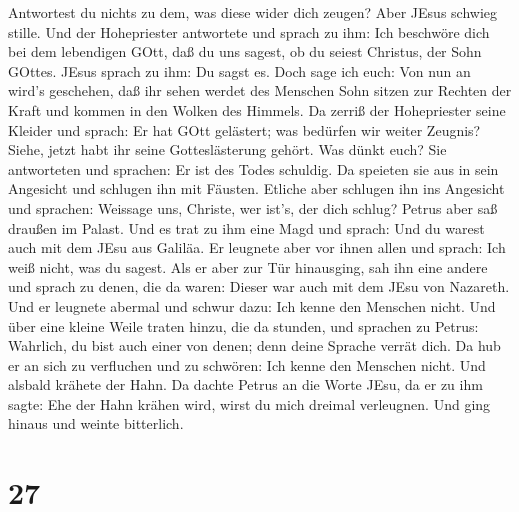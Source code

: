 Antwortest du nichts zu dem, was diese wider dich zeugen? 
Aber JEsus schwieg stille. Und der Hohepriester antwortete und sprach zu
ihm: Ich beschwöre dich bei dem lebendigen GOtt, daß du uns sagest, ob
du seiest Christus, der Sohn GOttes.  JEsus sprach zu ihm:
Du sagst es. Doch sage ich euch: Von nun an wird's geschehen, daß ihr
sehen werdet des Menschen Sohn sitzen zur Rechten der Kraft und kommen
in den Wolken des Himmels.  Da zerriß der Hohepriester
seine Kleider und sprach: Er hat GOtt gelästert; was bedürfen wir weiter
Zeugnis? Siehe, jetzt habt ihr seine Gotteslästerung gehört.
 Was dünkt euch? Sie antworteten und sprachen: Er ist des
Todes schuldig.  Da speieten sie aus in sein Angesicht und
schlugen ihn mit Fäusten. Etliche aber schlugen ihn ins Angesicht
 und sprachen: Weissage uns, Christe, wer ist's, der dich
schlug?  Petrus aber saß draußen im Palast. Und es trat zu
ihm eine Magd und sprach: Und du warest auch mit dem JEsu aus Galiläa.
 Er leugnete aber vor ihnen allen und sprach: Ich weiß
nicht, was du sagest.  Als er aber zur Tür hinausging, sah
ihn eine andere und sprach zu denen, die da waren: Dieser war auch mit
dem JEsu von Nazareth.  Und er leugnete abermal und schwur
dazu: Ich kenne den Menschen nicht.  Und über eine kleine
Weile traten hinzu, die da stunden, und sprachen zu Petrus: Wahrlich, du
bist auch einer von denen; denn deine Sprache verrät dich. 
Da hub er an sich zu verfluchen und zu schwören: Ich kenne den Menschen
nicht. Und alsbald krähete der Hahn.  Da dachte Petrus an
die Worte JEsu, da er zu ihm sagte: Ehe der Hahn krähen wird, wirst du
mich dreimal verleugnen. Und ging hinaus und weinte bitterlich.

\hypertarget{section-26}{%
\section{27}\label{section-26}}

